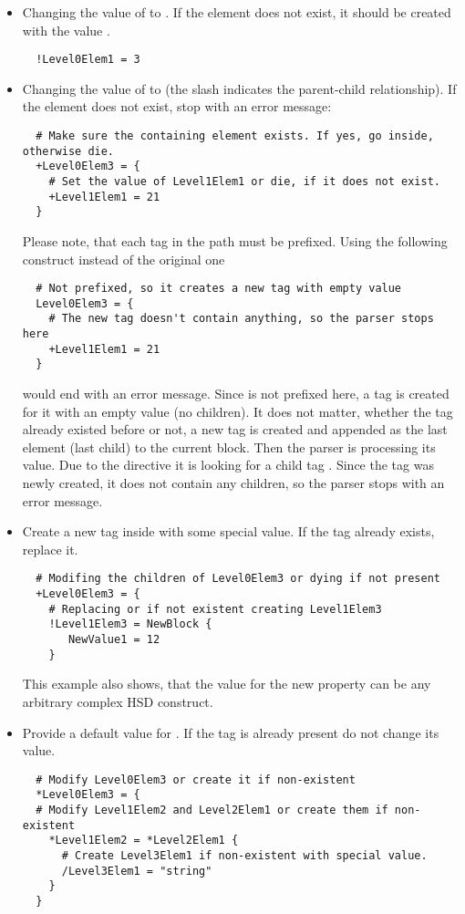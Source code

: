 \begin{itemize}
\item Changing the value of  to . If the element does not
  exist, it should be created with the value .
\begin{verbatim}
  !Level0Elem1 = 3
\end{verbatim}

\item Changing the value of  to  (the slash
  indicates the parent-child relationship). If the element does not exist, stop
  with an error message:
\begin{verbatim}
  # Make sure the containing element exists. If yes, go inside, otherwise die.
  +Level0Elem3 = {
    # Set the value of Level1Elem1 or die, if it does not exist.
    +Level1Elem1 = 21
  }
\end{verbatim}
  Please note, that each tag in the path must be prefixed. Using the following
  construct instead of the original one
\begin{verbatim}
  # Not prefixed, so it creates a new tag with empty value
  Level0Elem3 = {
    # The new tag doesn't contain anything, so the parser stops here
    +Level1Elem1 = 21
  }
\end{verbatim}
  would end with an error message. Since  is not prefixed here,
  a tag is created for it with an empty value (no children). It does not matter,
  whether the tag already existed before or not, a new tag is created and
  appended as the last element (last child) to the current block. Then the
  parser is processing its value. Due to the  directive it is
  looking for a child tag . Since the tag was newly created,
  it does not contain any children, so the parser stops with an error message.

\item Create a new tag  inside  with some
  special value. If the tag already exists, replace it.
\begin{verbatim}
  # Modifing the children of Level0Elem3 or dying if not present
  +Level0Elem3 = {
    # Replacing or if not existent creating Level1Elem3
    !Level1Elem3 = NewBlock {
       NewValue1 = 12
    }
\end{verbatim}
  This example also shows, that the value for the new property can be any
  arbitrary complex HSD construct.

\item Provide a default value  for
  . If the tag is already
  present do not change its value.
\begin{verbatim}
  # Modify Level0Elem3 or create it if non-existent
  *Level0Elem3 = {
  # Modify Level1Elem2 and Level2Elem1 or create them if non-existent
    *Level1Elem2 = *Level2Elem1 {
      # Create Level3Elem1 if non-existent with special value.
      /Level3Elem1 = "string"
    }
  }
\end{verbatim}


\end{itemize}
